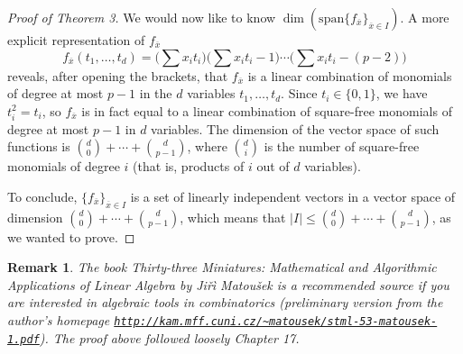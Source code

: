 \documentclass[a4paper]{article}
\theoremstyle{plain}
\theoremstyle{myremark}
\newtheorem{remark}[lemma]{Remark}
\newcommand{\oo}[1]{\overline{#1}}
\begin{document}
\begin{proof}[Proof of Theorem 3]
\smallskip
We would now like to know $\dim(\mathrm{span}\{f_{\oo{x}}\}_{\oo{x}\in I})$. A more explicit representation of $f_{\oo{x}}$
$$f_{\oo{x}}(t_1,\ldots,t_d)=\Big(\sum x_it_i\Big)\Big(\sum x_it_i-1\Big)\cdots\Big(\sum x_it_i-(p-2)\Big)$$
reveals, after opening the brackets, that $f_{\oo{x}}$ is a linear combination of monomials of degree at most $p-1$ in the $d$ variables $t_1,\ldots,t_d$. Since $t_i\in\{0,1\}$, we have $t_i^2=t_i$, so $f_{\oo{x}}$ is in fact equal to a linear combination of square-free monomials of degree at most $p-1$ in $d$ variables. The dimension of the vector space of such functions is ${d\choose 0}+\cdots+{d\choose p-1}$, where ${d\choose i}$ is the number of square-free monomials of degree $i$ (that is, products of $i$ out of $d$ variables).

\smallskip
To conclude, $\{f_{\oo{x}}\}_{\oo{x}\in I}$ is a set of linearly independent vectors in a vector space of dimension ${d\choose 0}+\cdots+{d\choose p-1}$, which means that $|I|\leq {d\choose 0}+\cdots+{d\choose p-1}$, as we wanted to prove.
\end{proof}

\begin{remark}The book \textit{Thirty-three Miniatures: Mathematical and Algorithmic Applications of Linear Algebra} by Ji\v{r}\`{i} Matou\v{s}ek is a recommended source if you are interested in algebraic tools in combinatorics (preliminary version from the author's homepage \href{http://kam.mff.cuni.cz/~matousek/stml-53-matousek-1.pdf}{\texttt{http://kam.mff.cuni.cz/\~{}matousek/stml-53-matousek-1.pdf}}). The proof above followed loosely Chapter 17.
\end{remark}
\end{document}
